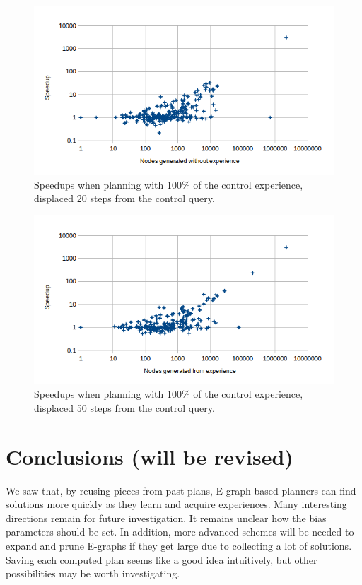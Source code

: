 \documentclass[letterpaper]{article}
\begin{document}
\begin{figure}
	\centering
	\includegraphics[scale=0.5]{Speedup_100_20.png}
	\caption{Speedups when planning with 100\% of the control experience, displaced 20 steps from the control query.}
	 \label{fig:s_100_20}
\end{figure}

\begin{figure}
	\centering
	\includegraphics[scale=0.5]{Speedup_100_50.png}
	\caption{Speedups when planning with 100\% of the control experience, displaced 50 steps from the control query.}
	 \label{fig:s_100_50}
\end{figure}

\section{Conclusions (will be revised)}

We saw that, by reusing pieces from past plans, E-graph-based planners can find solutions more quickly as they learn and acquire experiences. Many interesting directions remain for future investigation. It remains unclear how the bias parameters should be set. In addition, more advanced schemes will be needed to expand and prune E-graphs if they get large due to collecting a lot of solutions. Saving each computed plan seems like a good idea intuitively, but other possibilities may be worth investigating.
\end{document}
